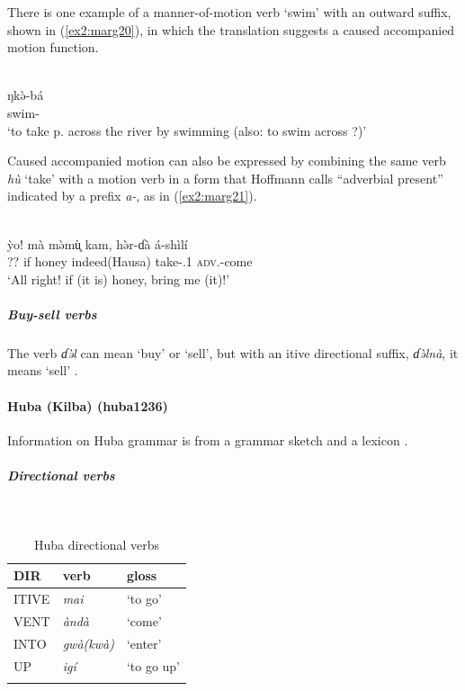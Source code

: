 There is one example of a manner-of-motion verb `swim' with an outward suffix, shown in (\ref{ex2:marg20}), in which the translation suggests a caused accompanied motion function. 

\ea\label{ex2:marg20}
 \\
\gll ŋkə̀-bá \\
swim- \\
\glt `to take p. across the river by swimming (also: to swim across ?)'
\z

Caused accompanied motion can also be expressed by combining the same verb \textit{hù} `take' with a motion verb in a form that Hoffmann calls ``adverbial present'' indicated by a prefix \textit{a-}, as in (\ref{ex2:marg21}).

\ea\label{ex2:marg21}
 \\
\gll ỳo! mà mə̀mù̥ kam, hə̀r-ɗà á-shìlí  \\
?? if honey indeed(Hausa) take-.1 \textsc{adv}.-come \\
\glt `All right! if (it is) honey, bring me (it)!'
\z 

\subparagraph{Buy-sell verbs}

The verb \textit{ɗə̀l} can mean `buy' or `sell', but with an itive directional suffix, \textit{ɗə̀lnà}, it means `sell' \citep[122]{hoffmannGrammarMargiLanguage1963}.

\paragraph*{Huba (Kilba) (huba1236)} \label{huba}

Information on Huba grammar is from a grammar sketch \citep{muazuGrammarKilbaLanguage2009} and a lexicon \citep{muazuModernKilbaDictionary2015}.

\subparagraph{Directional verbs}~

\begin{table}[H]
	\caption{Huba directional verbs} 
	\label{tab:hubaV}
	\begin{tabular}{lll} %
		\lsptoprule
		DIR & verb & gloss   \\ %
		\midrule
		ITIVE & \textit{mai} & `to go' \\
		VENT & \textit{àndà} & `come' \\
		INTO& \textit{gwà(kwà)} & `enter' \\
		UP & \textit{igí} & `to go up' \\
		\lspbottomrule
	\end{tabular}
\end{table}


